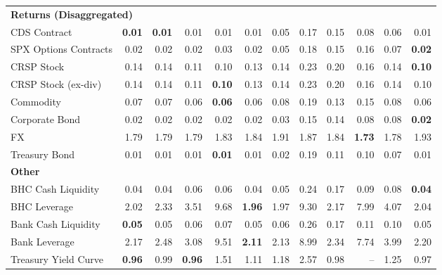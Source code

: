 \begin{table}[htbp]
\begin{tabular}{@{}lrrrrrrrrrrr@{}}
\midrule
\multicolumn{12}{l}{\textbf{Returns (Disaggregated)}} \\
CDS Contract & \textbf{0.01} & \textbf{0.01} & 0.01 & 0.01 & 0.01 & 0.05 & 0.17 & 0.15 & 0.08 & 0.06 & 0.01 \\
SPX Options Contracts & 0.02 & 0.02 & 0.02 & 0.03 & 0.02 & 0.05 & 0.18 & 0.15 & 0.16 & 0.07 & \textbf{0.02} \\
CRSP Stock & 0.14 & 0.14 & 0.11 & 0.10 & 0.13 & 0.14 & 0.23 & 0.20 & 0.16 & 0.14 & \textbf{0.10} \\
CRSP Stock (ex-div) & 0.14 & 0.14 & 0.11 & \textbf{0.10} & 0.13 & 0.14 & 0.23 & 0.20 & 0.16 & 0.14 & 0.10 \\
Commodity & 0.07 & 0.07 & 0.06 & \textbf{0.06} & 0.06 & 0.08 & 0.19 & 0.13 & 0.15 & 0.08 & 0.06 \\
Corporate Bond & 0.02 & 0.02 & 0.02 & 0.02 & 0.02 & 0.03 & 0.15 & 0.14 & 0.08 & 0.08 & \textbf{0.02} \\
FX & 1.79 & 1.79 & 1.79 & 1.83 & 1.84 & 1.91 & 1.87 & 1.84 & \textbf{1.73} & 1.78 & 1.93 \\
Treasury Bond & 0.01 & 0.01 & 0.01 & \textbf{0.01} & 0.01 & 0.02 & 0.19 & 0.11 & 0.10 & 0.07 & 0.01 \\
\midrule
\multicolumn{12}{l}{\textbf{Other}} \\
BHC Cash Liquidity & 0.04 & 0.04 & 0.06 & 0.06 & 0.04 & 0.05 & 0.24 & 0.17 & 0.09 & 0.08 & \textbf{0.04} \\
BHC Leverage & 2.02 & 2.33 & 3.51 & 9.68 & \textbf{1.96} & 1.97 & 9.30 & 2.17 & 7.99 & 4.07 & 2.04 \\
Bank Cash Liquidity & \textbf{0.05} & 0.05 & 0.06 & 0.07 & 0.05 & 0.06 & 0.26 & 0.17 & 0.11 & 0.10 & 0.05 \\
Bank Leverage & 2.17 & 2.48 & 3.08 & 9.51 & \textbf{2.11} & 2.13 & 8.99 & 2.34 & 7.74 & 3.99 & 2.20 \\
Treasury Yield Curve & \textbf{0.96} & 0.99 & \textbf{0.96} & 1.51 & 1.11 & 1.18 & 2.57 & 0.98 & -- & 1.25 & 0.97 \\
\bottomrule
\end{tabular}
\vspace{0.1cm}

\end{table}
